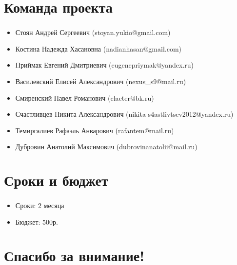 \documentclass[c]{beamer}  %
\begin{document}
    

\begin{frame}
\end{frame}


\section{Команда проекта}

\begin{frame}
\frametitle{\insertsection} 
\begin{itemize}
    \item Стоян Андрей Сергеевич (stoyan.yukio@gmail.com)
    \item Костина Надежда Хасановна (nadianhasan@gmail.com)
    \item Приймак Евгений Дмитриевич (eugenepriymak@yandex.ru)
    \item Василевский Елисей Александрович (nexus\_s9@mail.ru)
    \item Смиренский Павел Романович (clacter@bk.ru)
    \item Счастливцев Никита Александрович (nikita-s4astlivtsev2012@yandex.ru)
    \item Темиргалиев Рафаэль Анварович (rafantem@mail.ru)
    \item Дубровин Анатолий Максимович (dubrovinanatolii@mail.ru)
\end{itemize}
\end{frame}










\section{Сроки и бюджет}

\begin{frame}
\frametitle{\insertsection} 
\framesubtitle{\insertsubsection}
\begin{itemize}
    \item Сроки: 2 месяца
    \item Бюджет: 500р.
\end{itemize}
\end{frame}


\section{Спасибо за внимание!}

\begin{frame}
\end{frame}
\end{document}
